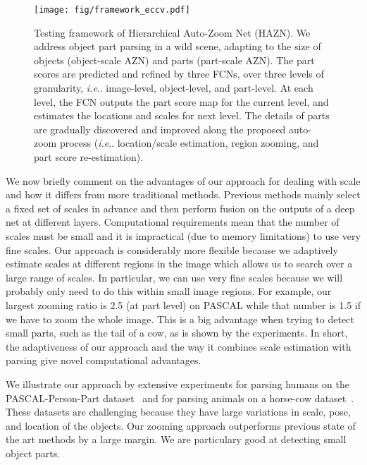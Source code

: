 \documentclass[runningheads]{llncs}
\makeatletter
\DeclareRobustCommand\onedot{\futurelet\@let@token\@onedot}
\def\@onedot{\ifx\@let@token.\else.\null\fi\xspace}
\def\ie{\emph{i.e}\onedot} \def\Ie{\emph{I.e}\onedot}
\makeatother
\begin{document}
\begin{figure}[t]
\begin{center}
\texttt{[image: fig/framework\_eccv.pdf]}
\end{center}
\vspace{-1\baselineskip}
\caption{Testing framework of Hierarchical Auto-Zoom Net (HAZN). We address object part parsing in a wild scene, adapting to the size of objects (object-scale AZN) and parts (part-scale AZN). The part scores are predicted and refined by three FCNs, over three levels of granularity, \ie image-level, object-level, and part-level. At each level, the FCN outputs the part score map for the current level, and estimates the locations and scales for next level. The details of parts are gradually discovered and improved along the proposed auto-zoom process (\ie location/scale estimation, region zooming, and part score re-estimation).}
\vspace{-1.6\baselineskip}
\label{fig:framework}
\end{figure}









We now briefly comment on the advantages of our approach for dealing with scale and how it differs from more traditional methods. Previous methods mainly select a fixed set of scales in advance and then perform fusion on the outputs of a deep net at different layers. Computational requirements mean that the number of scales must be small and it is impractical (due to memory limitations) to use very fine scales. Our approach is considerably more flexible because we adaptively estimate scales at different regions in the image which allows us to search over a large range of scales. In particular, we can use very fine scales because we will probably only need to do this within small image regions. For example, our largest zooming ratio is 2.5 (at part level) on PASCAL while that number is 1.5 if we have to zoom the whole image. This is a big advantage when trying to detect small parts, such as the tail of a cow, as is shown by the experiments. In short, the adaptiveness of our approach and the way it combines scale estimation with parsing give novel computational advantages.

We illustrate our approach by extensive experiments for parsing humans on the PASCAL-Person-Part dataset~\cite{chen2014detect} and for parsing animals on a horse-cow dataset~\cite{wang2014semantic}. These datasets are challenging because they have large variations in scale, pose, and location of the objects. Our zooming approach outperforms previous state of the art methods by a large margin. We are particulary good at detecting small object parts.
\end{document}
